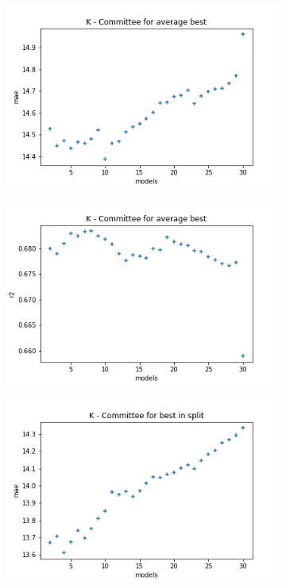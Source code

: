 \begin{figure}
     \centering
     \begin{subfigure}[b]{0.49\textwidth}
         \centering
         \includegraphics[width=\textwidth]{images/K_avg_mae.png}
         \caption{}
         \label{fig:ea-avg-mae-k}
     \end{subfigure}
     \begin{subfigure}[b]{0.49\textwidth}
         \centering
         \includegraphics[width=\textwidth]{images/K_avg_r2.png}
         \caption{}
         \label{fig:ea-avg-r2-k}
     \end{subfigure}
     \hfill
     \begin{subfigure}[b]{0.49\textwidth}
         \centering
         \includegraphics[width=\textwidth]{images/K_split_mae.png}

\end{subfigure}
\end{figure}
